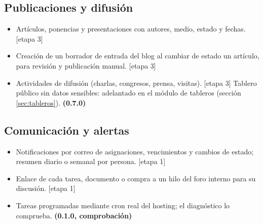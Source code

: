 \documentclass[11pt,a4paper]{article}
\newcommand{\etapa}[1]{\textcolor{grismedio}{[etapa #1]}}
\begin{document}
\subsection{Publicaciones y difusión}
\begin{itemize}
\item Artículos, ponencias y presentaciones con autores, medio, estado y fechas. \etapa{3}
\item Creación de un borrador de entrada del blog al cambiar de estado un artículo, para revisión y publicación manual. \etapa{3}
\item Actividades de difusión (charlas, congresos, prensa, visitas). \etapa{3} Tablero público sin datos sensibles: adelantado en el módulo de tableros (sección \ref{sec:tableros}). \textbf{(0.7.0)}
\end{itemize}

\subsection{Comunicación y alertas}
\begin{itemize}
\item Notificaciones por correo de asignaciones, vencimientos y cambios de estado; resumen diario o semanal por persona. \etapa{1}
\item Enlace de cada tarea, documento o compra a un hilo del foro interno para su discusión. \etapa{1}
\item Tareas programadas mediante cron real del hosting; el diagnóstico lo comprueba. \textbf{(0.1.0, comprobación)}
\end{itemize}
\end{document}
